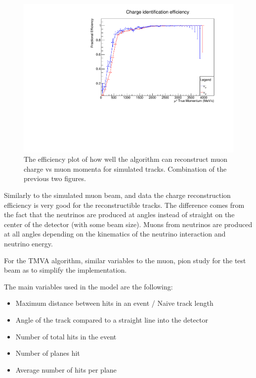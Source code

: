 \begin{figure}[h!]
\centering
\includegraphics[width=.9\textwidth]{figures/NeutrinoChap/CombinedNuStormChargeFittedEff.pdf}
\caption{The efficiency plot of how well the algorithm can reconstruct muon charge vs muon momenta for simulated tracks. Combination of the previous two figures.}
\label{fig:NuSTORMTASDCombined}
\end{figure}

Similarly to the simulated muon beam, and data the charge reconstruction efficiency is very good for the reconstructible tracks. The difference comes from the fact that the neutrinos are produced at angles instead of straight on the center of the detector (with some beam size). Muons from neutrinos are produced at all angles depending on the kinematics of the neutrino interaction and neutrino energy. 

For the TMVA algorithm, similar variables to the muon, pion study for the test beam as to simplify the implementation.

The main variables used in the model are the following:
\begin{itemize}
\item Maximum distance between hits in an event / Naive track length
\item Angle of the track compared to a straight line into the detector
\item Number of total hits in the event
\item Number of planes hit
\item Average number of hits per plane
\end{itemize}


